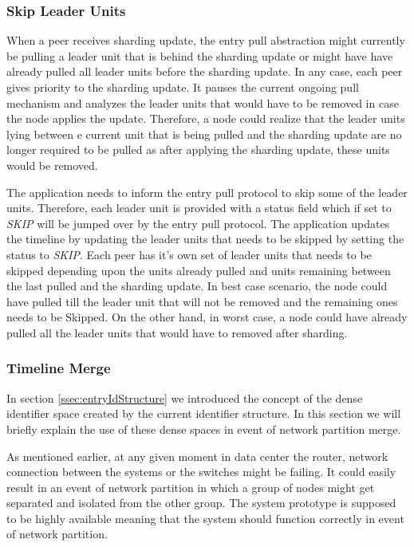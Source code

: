 \documentclass[12pt,a4paper,twoside,openright]{book}
\begin{document}
\subsubsection{Skip Leader Units}

When a peer receives sharding update, the entry pull abstraction might currently be pulling a leader unit that is behind the sharding update or might have have already pulled all leader units before the sharding update. In any case, each peer gives priority to the sharding update. It pauses the current ongoing pull mechanism and analyzes the leader units that would have to be removed in case the node applies the update. Therefore, a node could realize that the leader units lying between e current unit that is being pulled and the sharding update are no longer required to be pulled as after applying the sharding update, these units would be removed.
\par The application needs to inform the entry pull protocol to skip some of the leader units. Therefore, each leader unit is provided with a status field which if set to \textit{SKIP} will be jumped over by the entry pull protocol. The application updates the timeline by updating the leader units that needs to be skipped by setting the status to \textit{SKIP}. Each peer has it's own set of leader units that needs to be skipped depending upon the units already pulled and units remaining between the last pulled and the sharding update. In best case scenario, the node could have pulled till the leader unit that will not be removed and the remaining ones needs to be Skipped. On the other hand, in worst case, a node could have already pulled all the leader units that would have to removed after sharding.

\subsubsection{Timeline Merge}
In section \ref{ssec:entryIdStructure} we introduced the concept of the dense identifier space created by the current identifier structure. In this section we will briefly explain the use of these dense spaces in event of network partition merge. 


\par As mentioned earlier, at any given moment in data center the router, network connection between the systems or the switches might be failing. It could easily result in an event of network partition in which a group of nodes might get separated and isolated from the other group. The system prototype is supposed to be highly available meaning that the system should function correctly in event of network partition. 
\end{document}
